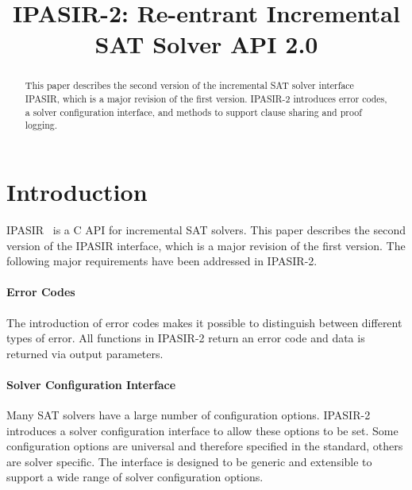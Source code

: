 \documentclass[sat]{iosart2x}
\begin{document}
\begin{frontmatter}
\title{IPASIR-2: Re-entrant Incremental SAT Solver API 2.0}

\begin{aug}
\author[A]{ }
\author{ }
\author[A]{ }
\author[B]{ }
\author[C]{ }
\address[A]{Institute of Theoretical Informatics, , }
\address[B]{Department first, , Abbreviate US states, }
\address[C]{Department first, , Abbreviate US states, }
\end{aug}

\begin{abstract}
This paper describes the second version of the incremental SAT solver interface IPASIR, which is a major revision of the first version.
IPASIR-2 introduces error codes, a solver configuration interface, and methods to support clause sharing and proof logging.
\end{abstract}

\begin{keyword}
\end{keyword}
\end{frontmatter}


\section{Introduction}

IPASIR~\cite{ipasir} is a C API for incremental SAT solvers.
This paper describes the second version of the IPASIR interface, which is a major revision of the first version.
The following major requirements have been addressed in IPASIR-2.

\paragraph{Error Codes}
The introduction of error codes makes it possible to distinguish between different types of error.
All functions in IPASIR-2 return an error code and data is returned via output parameters.

\paragraph{Solver Configuration Interface}
Many SAT solvers have a large number of configuration options.
IPASIR-2 introduces a solver configuration interface to allow these options to be set.
Some configuration options are universal and therefore specified in the standard, others are solver specific.
The interface is designed to be generic and extensible to support a wide range of solver configuration options.
\end{document}
